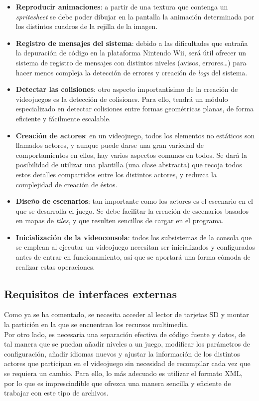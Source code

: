 \begin{itemize}
\item \textbf{Reproducir animaciones}: a partir de una textura que contenga un \emph{spritesheet} se debe poder dibujar en la pantalla la animación determinada por los distintos cuadros de la rejilla de la imagen.
\item \textbf{Registro de mensajes del sistema}: debido a las dificultades que entraña la depuración de código en la plataforma Nintendo Wii, será útil ofrecer un sistema de registro de mensajes con distintos niveles (avisos, errores\ldots) para hacer menos compleja la detección de errores y creación de \emph{logs} del sistema.
\item \textbf{Detectar las colisiones}: otro aspecto importantísimo de la creación de videojuegos es la detección de colisiones. Para ello,  tendrá un módulo especializado en detectar colisiones entre formas geométricas planas, de forma eficiente y fácilmente escalable.
\item \textbf{Creación de actores}: en un videojuego, todos los elementos no estáticos son llamados actores, y aunque puede darse una gran variedad de comportamientos en ellos, hay varios aspectos comunes en todos. Se dará la posibilidad de utilizar una plantilla (una clase abstracta) que recoja todos estos detalles compartidos entre los distintos actores, y reduzca la complejidad de creación de éstos.
\item \textbf{Diseño de escenarios}: tan importante como los actores es el escenario en el que se desarrolla el juego. Se debe facilitar la creación de escenarios basados en mapas de \emph{tiles}, y que resulten sencillos de cargar en el programa.
\item \textbf{Inicialización de la videoconsola}: todos los subsistemas de la consola que se emplean al ejecutar un videojuego necesitan ser inicializados y configurados antes de entrar en funcionamiento, así que se aportará una forma cómoda de realizar estas operaciones.
\end{itemize}

\subsection{Requisitos de interfaces externas}

Como ya se ha comentado, se necesita acceder al lector de tarjetas SD y montar la partición en la que se encuentran los recursos multimedia.\\

Por otro lado, es necesaria una separación efectiva de código fuente y datos, de tal manera que se puedan añadir niveles a un juego, modificar los parámetros de configuración, añadir idiomas nuevos y ajustar la información de los distintos actores que participan en el videojuego sin necesidad de recompilar cada vez que se requiera un cambio. Para ello, lo más adecuado es utilizar el formato XML, por lo que es imprescindible que  ofrezca una manera sencilla y eficiente de trabajar con este tipo de archivos.

